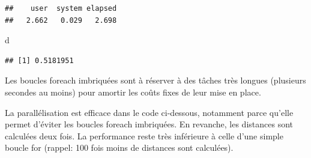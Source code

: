 \documentclass[
  12pt,
  french,
  a4paper,
  extrafontsizes,onecolumn,openright
  ]{memoir}
\newenvironment{Shaded}{\begin{snugshade}}{\end{snugshade}}
\newcommand{\ControlFlowTok}[1]{\textcolor[rgb]{0.13,0.29,0.53}{\textbf{#1}}}
\newcommand{\DataTypeTok}[1]{\textcolor[rgb]{0.13,0.29,0.53}{#1}}
\newcommand{\DecValTok}[1]{\textcolor[rgb]{0.00,0.00,0.81}{#1}}
\newcommand{\KeywordTok}[1]{\textcolor[rgb]{0.13,0.29,0.53}{\textbf{#1}}}
\newcommand{\NormalTok}[1]{#1}
\newcommand{\OperatorTok}[1]{\textcolor[rgb]{0.81,0.36,0.00}{\textbf{#1}}}
\newcommand{\StringTok}[1]{\textcolor[rgb]{0.31,0.60,0.02}{#1}}
\newlength{\rf}
\begin{document}
\begin{verbatim}
##    user  system elapsed 
##   2.662   0.029   2.698
\end{verbatim}

\begin{Shaded}
\begin{Highlighting}[]
\NormalTok{d}
\end{Highlighting}
\end{Shaded}

\begin{verbatim}
## [1] 0.5181951
\end{verbatim}

\normalsize

Les boucles foreach imbriquées sont à réserver à des tâches très longues (plusieurs secondes au moins) pour amortir les coûts fixes de leur mise en place.

La parallélisation est efficace dans le code ci-dessous, notamment parce qu'elle permet d'éviter les boucles foreach imbriquées.
En revanche, les distances sont calculées deux fois.
La performance reste très inférieure à celle d'une simple boucle for (rappel: 100 fois moins de distances sont calculées).

\scriptsize

\begin{Shaded}
\end{Shaded}
\end{document}
